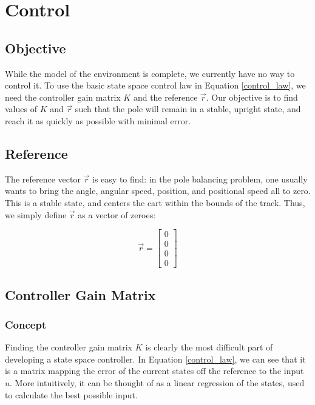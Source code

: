 \documentclass[11pt]{article}
\begin{document}
\section{Control}

\subsection{Objective}

While the model of the environment is complete, we currently have no way to control it. To use the basic state space control law in Equation \ref{control_law}, we need the controller gain matrix $K$ and the reference $\vec{r}$. Our objective is to find values of $K$ and $\vec{r}$ such that the pole will remain in a stable, upright state, and reach it as quickly as possible with minimal error.

\subsection{Reference}

The reference vector $\vec{r}$ is easy to find: in the pole balancing problem, one usually wants to bring the angle, angular speed, position, and positional speed all to zero. This is a stable state, and centers the cart within the bounds of the track. Thus, we simply define $\vec{r}$ as a vector of zeroes:

\begin{equation}
    \displaystyle
    \vec{r} = \begin{bmatrix}
        0 \\
        0 \\
        0 \\
        0
    \end{bmatrix}
\end{equation}

\subsection{Controller Gain Matrix}

\subsubsection{Concept}

Finding the controller gain matrix $K$ is clearly the most difficult part of developing a state space controller. In Equation \ref{control_law}, we can see that it is a matrix mapping the error of the current states off the reference to the input $u$. More intuitively, it can be thought of as a linear regression of the states, used to calculate the best possible input.
\end{document}
